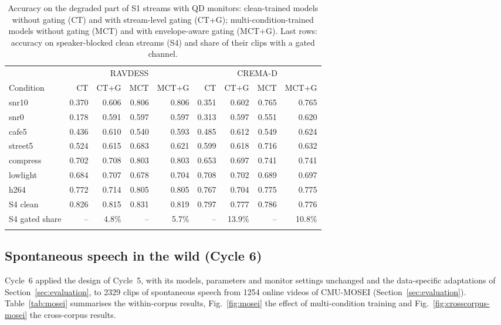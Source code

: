 \begin{table}[t]
\setlength{\tabcolsep}{4pt}
\caption{Accuracy on the degraded part of S1 streams with QD monitors: clean-trained models without gating (CT) and with stream-level gating (CT+G); multi-condition-trained models without gating (MCT) and with envelope-aware gating (MCT+G). Last rows: accuracy on speaker-blocked clean streams (S4) and share of their clips with a gated channel.}\label{tab:gating-ext}
\centering\footnotesize
\begin{tabular}{@{}lrrrrrrrr@{}}
\toprule
 & \multicolumn{4}{c}{RAVDESS} & \multicolumn{4}{c}{CREMA-D} \\
\cmidrule(lr){2-5}\cmidrule(l){6-9}
Condition & CT & CT+G & MCT & MCT+G & CT & CT+G & MCT & MCT+G \\
\midrule
snr10 & 0.370 & 0.606 & 0.806 & 0.806 & 0.351 & 0.602 & 0.765 & 0.765 \\
snr0 & 0.178 & 0.591 & 0.597 & 0.597 & 0.313 & 0.597 & 0.551 & 0.620 \\
cafe5 & 0.436 & 0.610 & 0.540 & 0.593 & 0.485 & 0.612 & 0.549 & 0.624 \\
street5 & 0.524 & 0.615 & 0.683 & 0.621 & 0.599 & 0.618 & 0.716 & 0.632 \\
compress & 0.702 & 0.708 & 0.803 & 0.803 & 0.653 & 0.697 & 0.741 & 0.741 \\
lowlight & 0.684 & 0.707 & 0.678 & 0.704 & 0.708 & 0.702 & 0.689 & 0.697 \\
h264 & 0.772 & 0.714 & 0.805 & 0.805 & 0.767 & 0.704 & 0.775 & 0.775 \\
\midrule
S4 clean & 0.826 & 0.815 & 0.831 & 0.819 & 0.797 & 0.777 & 0.786 & 0.776 \\
S4 gated share & -- & 4.8\% & -- & 5.7\% & -- & 13.9\% & -- & 10.8\% \\
\botrule
\end{tabular}
\end{table}

\subsection{Spontaneous speech in the wild (Cycle 6)}\label{sec:cycle6}

Cycle~6 applied the design of Cycle~5, with its models, parameters and monitor settings unchanged and the data-specific adaptations of Section~\ref{sec:evaluation}, to 2329 clips of spontaneous speech from 1254 online videos of CMU-MOSEI (Section~\ref{sec:evaluation}). Table~\ref{tab:mosei} summarises the within-corpus results, Fig.~\ref{fig:mosei} the effect of multi-condition training and Fig.~\ref{fig:crosscorpus-mosei} the cross-corpus results.

